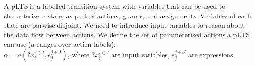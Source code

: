 \documentclass{llncs}
\begin{document}
A pLTS is a labelled transition system with variables that can be
used to characterise a state, as part of actions, guards, and
assignments. 
Variables of each state are parwise disjoint.
We need to introduce input variables to reason about the data flow between actions.
We  define the set of parameterised actions a pLTS can use ($a$
ranges over action labels):\\
$\alpha=a(?x_i^{i \in I}, 
e_j^{j \in J})$, where $?x_i^{i \in I}$ are input variables, $e_j^{j \in J}$ 
are expressions.
\end{document}
